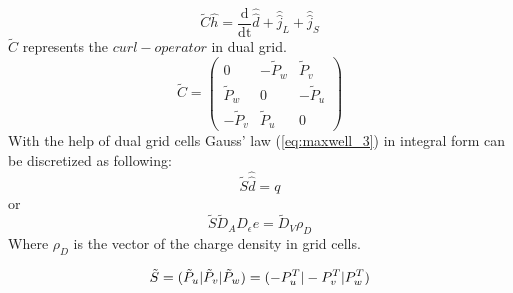 \begin{equation}
\tilde{C}\widehat{h}=\frac{\mathrm{d}}{\mathrm{dt}}\widehat{\widehat{d}}+\widehat{\widehat{j}}_{L}+\widehat{\widehat{j}}_{S}
\label{eq:ampere_sample}
\end{equation}
$\tilde{C}$ represents the $curl-operator$ in dual grid.
\begin{equation}
\tilde{C}=
	\begin{pmatrix}
	0&-\tilde{P}_{w}&\tilde{P}_{v}\\
	\tilde{P}_{w}&0&-\tilde{P}_{u}\\
	-\tilde{P}_{v}&\tilde{P}_{u}&0
	\end{pmatrix}
	\label{eq:dual_C_matrix}
\end{equation}
With the help of dual grid cells Gauss' law (\ref{eq:maxwell_3}) in integral form can be discretized\cite{script_FeldSim} as following:
\begin{equation}
\tilde{S}\widehat{\widehat{d}}=q
\label{eq:gausslaw}
\end{equation}
or
\begin{equation}
\tilde{S}\tilde{D}_{A}D_{\epsilon}e=\tilde{D}_{V}\rho_{D}
\label{eq:gausslaw_sample}
\end{equation}
Where $\rho_{D}$ is the vector of the charge density in grid cells.

\begin{equation}
\tilde{S}=(\tilde{P}_{u}|\tilde{P}_{v}|\tilde{P}_{w})=(-P_{u}^{T}|-P_{v}^{T}|\-P_{w}^{T})
\label{eq:dual_S_matrix}
\end{equation}
